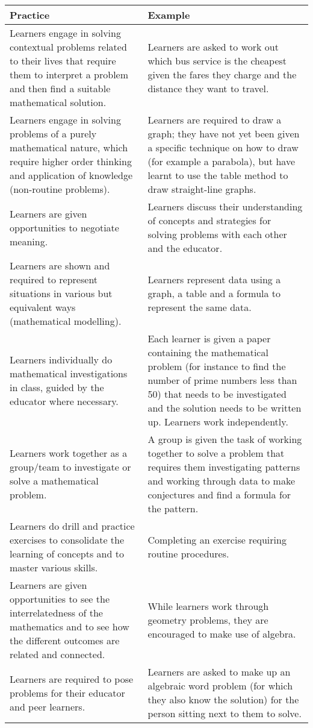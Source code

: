 \begin{table}[H]
\begin{center}
 \begin{tabular}{|p{6.5cm}|p{6.5cm}|} \hline 
  \textbf{Practice} & \textbf{Example} \\ \hline
Learners engage in solving contextual problems related to their lives that require them to interpret a problem and then find a suitable mathematical solution. &
Learners are asked to work out which bus service is the cheapest given the fares they charge and the distance they want to travel. \\ \hline
Learners engage in solving problems of a purely mathematical nature, which require higher order thinking and application of knowledge (non-routine problems). &
Learners are required to draw a graph; they have not yet been given a specific technique on how to draw (for example a parabola), but have learnt to use the table method to draw straight-line graphs. \\ \hline
Learners are given opportunities to negotiate meaning. &
Learners discuss their understanding of concepts and strategies for solving problems with each other and the educator. \\ \hline
Learners are shown and required to represent situations in various but equivalent ways (mathematical modelling). &
Learners represent data using a graph, a table and a formula to represent the same data. \\ \hline
Learners individually do mathematical investigations in class, guided by the educator where necessary.  &
Each learner is given a paper containing the mathematical problem (for instance to find the number of prime numbers less than 50) that needs to be investigated and the solution needs to be written up. Learners work independently. \\ \hline
Learners work together as a group/team to investigate or solve a mathematical problem. &
A group is given the task of working together to solve a problem that requires them investigating patterns and working through data to make conjectures and find a formula for the pattern. \\ \hline
Learners do drill and practice exercises to consolidate the learning of concepts and to master various skills. &
Completing an exercise requiring routine procedures. \\ \hline
Learners are given opportunities to see the interrelatedness of the mathematics and to see how the different outcomes are related and connected.  &
While learners work through geometry problems, they are encouraged to make use of algebra. \\ \hline
Learners are required to pose problems for their educator and peer learners. &
Learners are asked to make up an algebraic word problem (for which they also know the solution) for the person sitting next to them to solve. \\ \hline


 \end{tabular}
\end{center}
\end{table}

